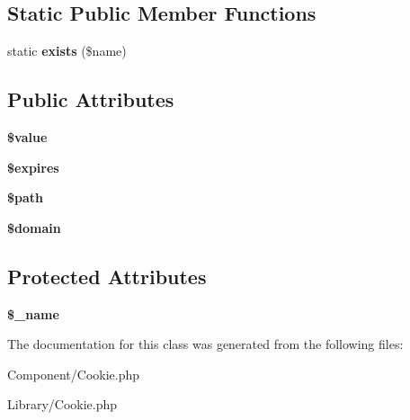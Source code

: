 \subsection*{Static Public Member Functions}
\begin{DoxyCompactItemize}
\item 
\hypertarget{classCookie_ad51a1a42a8cb4a60611e6dd1791478ac}{
static {\bfseries exists} (\$name)}
\label{classCookie_ad51a1a42a8cb4a60611e6dd1791478ac}

\end{DoxyCompactItemize}
\subsection*{Public Attributes}
\begin{DoxyCompactItemize}
\item 
\hypertarget{classCookie_ae670193bf994ae5869b31882154998d1}{
{\bfseries \$value}}
\label{classCookie_ae670193bf994ae5869b31882154998d1}

\item 
\hypertarget{classCookie_aefef959e4ccc496f73b90bafeabb7af2}{
{\bfseries \$expires}}
\label{classCookie_aefef959e4ccc496f73b90bafeabb7af2}

\item 
\hypertarget{classCookie_a25796543a5b84e9f81fd8ea355508d56}{
{\bfseries \$path}}
\label{classCookie_a25796543a5b84e9f81fd8ea355508d56}

\item 
\hypertarget{classCookie_a088cc3627624838d2eae7e72745a719b}{
{\bfseries \$domain}}
\label{classCookie_a088cc3627624838d2eae7e72745a719b}

\end{DoxyCompactItemize}
\subsection*{Protected Attributes}
\begin{DoxyCompactItemize}
\item 
\hypertarget{classCookie_add20beb35f6402602ba572988f4266aa}{
{\bfseries \$\_\-name}}
\label{classCookie_add20beb35f6402602ba572988f4266aa}

\end{DoxyCompactItemize}


The documentation for this class was generated from the following files:\begin{DoxyCompactItemize}
\item 
Component/Cookie.php\item 
Library/Cookie.php\end{DoxyCompactItemize}
